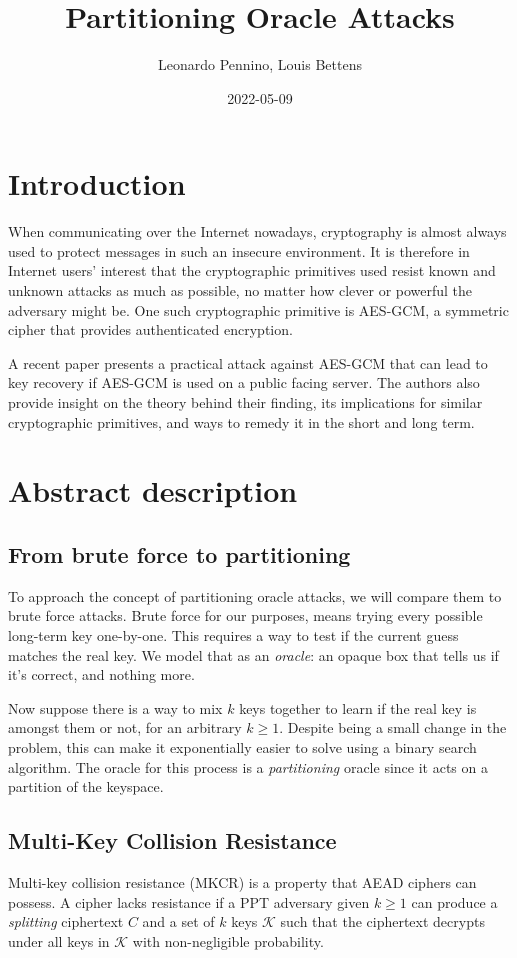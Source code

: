 \documentclass[9pt, a4paper]{article}
\date{2022-05-09}
\title{Partitioning Oracle Attacks}
\author{Leonardo Pennino, Louis Bettens}
\begin{document}
\maketitle

\section{Introduction}

When communicating over the Internet nowadays,
cryptography is almost always used to protect messages
in such an insecure environment.
It is therefore in Internet users' interest that
the cryptographic primitives used resist
known and unknown attacks as much as possible,
no matter how clever or powerful the adversary might be.
One such cryptographic primitive is AES-GCM\cite{aes-gcm},
a symmetric cipher that provides authenticated encryption.

A recent paper\cite{partitioning}
presents a practical attack against AES-GCM
that can lead to key recovery if AES-GCM is used on a public facing server.
The authors also provide insight on the theory behind their finding, 
its implications for similar cryptographic primitives,
and ways to remedy it in the short and long term.

\section{Abstract description}
\subsection{From brute force to partitioning}
To approach the concept of partitioning oracle attacks,
we will compare them to brute force attacks.
Brute force for our purposes, means
trying every possible long-term key one-by-one.
This requires a way to test if the current guess matches the real key.
We model that as an \emph{oracle}: an opaque box that tells us if it's correct, and nothing more.

Now suppose there is a way to mix $k$ keys together
to learn if the real key is amongst them or not,
for an arbitrary $k \geq 1$.
Despite being a small change in the problem,
this can make it exponentially easier to solve
using a binary search algorithm.
The oracle for this process is a \emph{partitioning} oracle since it acts on a partition of the keyspace.

\subsection{Multi-Key Collision Resistance}
Multi-key collision resistance (MKCR) is a property that AEAD ciphers can possess.
A cipher lacks resistance if a PPT adversary given $k \geq 1$ can produce a \emph{splitting} ciphertext $C$ and a set of $k$ keys $\mathcal K$ such that the ciphertext decrypts under all keys in $\mathcal K$ with non-negligible probability.
\end{document}

